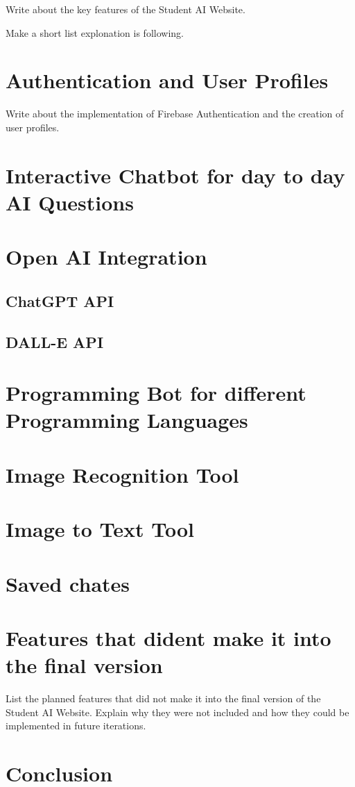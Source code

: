 Write about the key features of the Student AI Website.

Make a short list explonation is following.

\section{Authentication and User Profiles}

Write about the implementation of Firebase Authentication and the creation of user profiles.

\section{Interactive Chatbot for day to day AI Questions}

\section{Open AI Integration}

\subsection{ChatGPT API}

\subsection{DALL-E API}

\section{Programming Bot for different Programming Languages}

\section{Image Recognition Tool}

\section{Image to Text Tool}

\section{Saved chates}

\section{Features that dident make it into the final version}

List the planned features that did not make it into the final version of the Student AI Website.
Explain why they were not included and how they could be implemented in future iterations.

\section{Conclusion}





